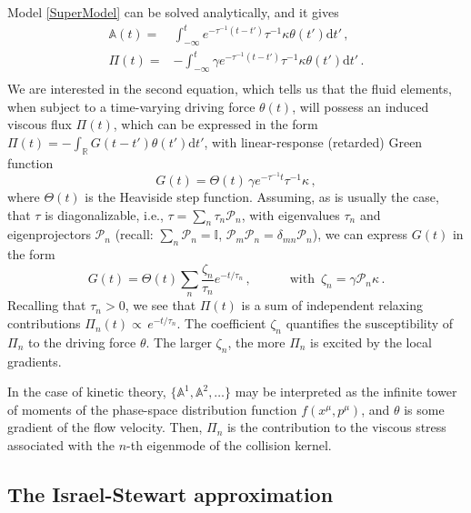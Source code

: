\documentclass[a4paper, amsfonts, amssymb, amsmath, reprint, showkeys, nofootinbib, twoside, onecolumn,notitlepage]{revtex4-2}
\newcommand{\spc}{\quad \quad \quad}
\renewcommand{\d}{\mathrm{d}}
\newcommand{\A}{\mathbb{A}}
\begin{document}
Model \eqref{SuperModel} can be solved analytically, and it gives 
\begin{equation}\label{SuperPrediction}
\begin{split}
\mathbb{A}(t)={}&\int_{-\infty}^t e^{-\tau^{-1}(t-t')} \tau^{-1}\kappa \theta(t')\d t' \, , \\
\Pi(t)={}&{-} \! \! \int_{-\infty}^t \gamma e^{-\tau^{-1}(t-t')} \tau^{-1}\kappa \theta(t')\d t' \, . \\
\end{split}
\end{equation}
We are interested in the second equation, which tells us that the fluid elements, when subject to a time-varying driving force $\theta(t)$, will possess an induced viscous flux $\Pi(t)$, which can be expressed in the form $\Pi(t)={-}\int_{\mathbb{R}} G(t-t')\theta(t')\d t'$, with linear-response (retarded) Green function
\begin{equation}\label{gigia}
    G(t) =\Theta(t) \, \gamma e^{-\tau^{-1}t} \tau^{-1}\kappa \, , 
\end{equation}
where $\Theta(t)$ is the Heaviside step function. Assuming, as is usually the case, that $\tau$ is diagonalizable, i.e., $\tau=\sum_n \tau_n \mathcal{P}_n$, with eigenvalues $\tau_n$ and eigenprojectors $\mathcal{P}_n$ (recall: $\sum_n \mathcal{P}_n{=}\mathbb{I}$, $\mathcal{P}_m \mathcal{P}_n{=}\delta_{mn}\mathcal{P}_n$), we can express $G(t)$ in the form
\begin{equation}\label{Green!}
G(t)= \Theta(t) \sum_n \dfrac{\zeta_n}{\tau_n} e^{-t/\tau_n} \, , \spc \text{with }\, \zeta_n = \gamma \mathcal{P}_n \kappa \, .    
\end{equation}
Recalling that $\tau_n{>}0$, we see that $\Pi(t)$ is a sum of independent relaxing contributions $\Pi_n(t) {\propto} \, e^{-t/\tau_n}$. The coefficient $\zeta_n$ quantifies the susceptibility of $\Pi_n$ to the driving force $\theta$. The larger $\zeta_n$, the more $\Pi_n$ is excited by the local gradients.

In the case of kinetic theory, $\{\A^1,\A^2,\ldots \}$ may be interpreted as the infinite tower of moments of the phase-space distribution function $f(x^\mu,p^\mu)$, and $\theta$ is some gradient of the flow velocity. Then, $\Pi_n$ is the contribution to the viscous stress associated with the $n$-th eigenmode of the collision kernel.


\subsection{The Israel-Stewart approximation}
\end{document}
